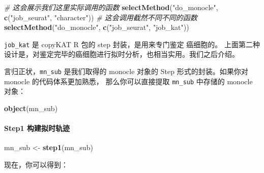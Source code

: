 \documentclass[
]{article}
\newenvironment{Shaded}{\begin{snugshade}}{\end{snugshade}}
\newcommand{\CommentTok}[1]{\textcolor[rgb]{0.56,0.35,0.01}{\textit{#1}}}
\newcommand{\KeywordTok}[1]{\textcolor[rgb]{0.13,0.29,0.53}{\textbf{#1}}}
\newcommand{\NormalTok}[1]{#1}
\newcommand{\OperatorTok}[1]{\textcolor[rgb]{0.81,0.36,0.00}{\textbf{#1}}}
\newcommand{\StringTok}[1]{\textcolor[rgb]{0.31,0.60,0.02}{#1}}
\begin{document}
\begin{Shaded}
\begin{Highlighting}[]
\CommentTok{\# 这会展示我们这里实际调用的函数}
\KeywordTok{selectMethod}\NormalTok{(}\StringTok{"do\_monocle"}\NormalTok{, }\KeywordTok{c}\NormalTok{(}\StringTok{"job\_seurat"}\NormalTok{, }\StringTok{"character"}\NormalTok{))}
\CommentTok{\# 这会调用截然不同不同的函数}
\KeywordTok{selectMethod}\NormalTok{(}\StringTok{"do\_monocle"}\NormalTok{, }\KeywordTok{c}\NormalTok{(}\StringTok{"job\_seurat"}\NormalTok{, }\StringTok{"job\_kat"}\NormalTok{))}
\end{Highlighting}
\end{Shaded}

\texttt{job\_kat} 是 copyKAT R 包的 step 封装，是用来专门鉴定 癌细胞的。
上面第二种设计是，对鉴定完毕的癌细胞进行拟时分析，也相当实用。我们之后介绍。

言归正状，\texttt{mn\_sub} 是我们取得的 monocle 对象的 Step 形式的封装。如果你对 monocle 的代码体系更加熟悉，
那么你可以直接提取 \texttt{mn\_sub} 中存储的 monocle 对象：

\begin{Shaded}
\begin{Highlighting}[]
\KeywordTok{object}\NormalTok{(mn\_sub)}
\end{Highlighting}
\end{Shaded}

\hypertarget{step1-ux6784ux5efaux62dfux65f6ux8f68ux8ff9}{%
\paragraph{Step1 构建拟时轨迹}\label{step1-ux6784ux5efaux62dfux65f6ux8f68ux8ff9}}

\begin{Shaded}
\begin{Highlighting}[]
\NormalTok{mn\_sub \textless{}{-}}\StringTok{ }\KeywordTok{step1}\NormalTok{(mn\_sub)}
\end{Highlighting}
\end{Shaded}

现在，你可以得到：

\begin{Shaded}
\end{Shaded}
\end{document}
